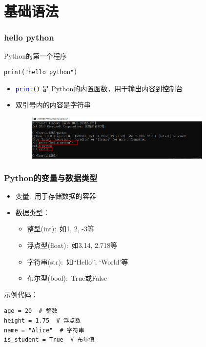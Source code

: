 \section{基础语法}
\begin{frame}[fragile]
	\frametitle{\textrm{hello python}}
	\textrm{Python}的第一个程序
    \begin{lstlisting}[style=pythonstyle]
print("hello python")
    \end{lstlisting}
    \begin{itemize}
	    \item \texttt{\textcolor{blue}{print}()} 是 \textrm{Python}的内置函数，用于输出内容到控制台
        \item 双引号内的内容是字符串
    \end{itemize}
\begin{figure}[h!]
\centering
\includegraphics[height=0.9in, width=4.0in, viewport=0 0 1559 387,clip]{Figures/python_command-windows-3.png}
\label{Python-run_hello}
\end{figure}
\end{frame}
%
\begin{frame}[fragile]
	\frametitle{\textrm{Python}的变量与数据类型}
    \begin{itemize}
        \item 变量:~用于存储数据的容器
        \item 数据类型：
            \begin{itemize}
		    \item 整型\textrm{(int)}:~如\textrm{1, 2, -3}等
		    \item 浮点型\textrm{(float)}:~如\textrm{3.14, 2.718}等
		    \item 字符串\textrm{(str)}:~如\textrm{``Hello'', `World'}等
		    \item 布尔型\textrm{(bool)}:~\textrm{True}或\textrm{False}
            \end{itemize}
    \end{itemize}
    示例代码：
    \begin{lstlisting}[style=pythonstyle]
age = 20  # 整数
height = 1.75  # 浮点数
name = "Alice"  # 字符串
is_student = True  # 布尔值
    \end{lstlisting}
\end{frame}
